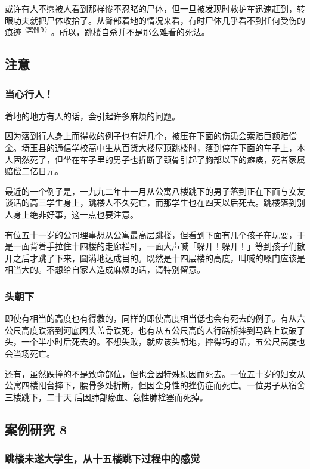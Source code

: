 \documentclass[UTF8]{ctexart}
\begin{document}
或许有人不愿被人看到那样惨不忍睹的尸体，但一旦被发现时救护车迅速赶到，转眼功夫就把尸体收拾了。从臀部着地的情况来看，有时尸体几乎看不到任何受伤的痕迹$^{（案例９）}$。所以，跳楼自杀并不是那么难看的死法。

\subsection{注意}

\subsubsection*{当心行人！}

着地的地方有人的话，会引起许多麻烦的问题。

因为落到行人身上而得救的例子也有好几个，被压在下面的伤患会索赔巨额赔偿金。埼玉县的通信学校高中生从百货大楼屋顶跳楼时，落到停在下面的车子上，本人固然死了，但坐在车子里的男子也折断了颈骨引起了胸部以下的瘫痪，死者家属赔偿二亿日元。

最近的一个例子是，一九九二年十一月从公寓八楼跳下的男子落到正在下面与女友谈话的高三学生身上，跳楼人不久死亡，而那学生也在四天以后死去。跳楼落到别人身上绝非好事，这一点也要注意。

有位五十一岁的公司理事想从公寓最高层跳楼，但看到下面有几个孩子在玩耍，于是一面背着手拉住十四楼的走廊栏杆，一面大声喊「躲开！躲开！」等到孩子们散开之后才跳了下来，圆满地达成目的。既然是十四层楼的高度，叫喊的嗓门应该是相当大的。不想给自家人造成麻烦的话，请特别留意。

\subsubsection*{头朝下}

即使有相当的高度也有得救的，同样的即使高度相当低也会有死去的例子。有从六公尺高度跌落到河底因头盖骨跌死，也有从五公尺高的人行路桥摔到马路上跌破了头，一个半小时后死去的。不想失败，就应该头朝地，摔得巧的话，五公尺高度也会当场死亡。

还有，虽然跌撞的不是致命部位，但也会因特殊原因而死去。一位五十岁的妇女从公寓四楼阳台摔下，腰骨多处折断，但因全身性的挫伤症而死亡。一位男子从宿舍三楼跳下，二十天 后因肺部瘀血、急性肺栓塞而死掉。

\subsection{案例研究 8}
\subsubsection*{跳楼未遂大学生，从十五楼跳下过程中的感觉}
\end{document}
